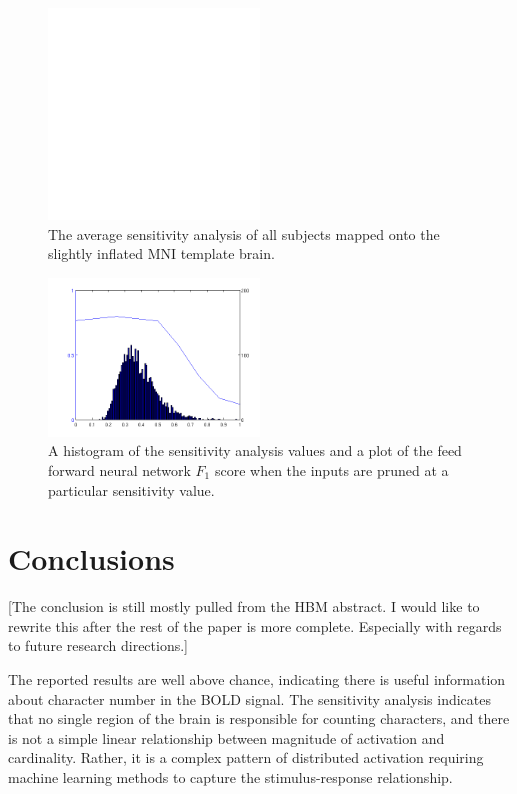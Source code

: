 \documentclass[final]{article}
\begin{document}
\begin{figure}[!htbp]
\centering
\includegraphics[width=0.5\textwidth]{figures/placeholder}
\caption{The average sensitivity analysis of all subjects mapped onto the slightly inflated MNI template brain.}
\label{fig:MNI-average-sensitivity}
\end{figure}

\begin{figure}[!htbp]
\centering
\includegraphics[width=0.5\textwidth]{figures/sensitivity-cutoff}
\caption{A histogram of the sensitivity analysis values and a plot of the feed forward neural network $F_1$ score when the inputs are pruned at a particular sensitivity value. }
\label{fig:sensitivity-cutoff}
\end{figure}

\section{Conclusions}
[The conclusion is still mostly pulled from the HBM abstract. I would like to rewrite this after the rest of the paper is more complete. Especially with regards to future research directions.]

The reported results are well above chance, indicating there is useful information about character number in the BOLD signal.
The sensitivity analysis indicates that no single region of the brain is responsible for counting characters, and there is not a simple linear relationship between magnitude of activation and cardinality.
Rather, it is a complex pattern of distributed activation requiring machine learning methods to capture the stimulus-response relationship.
\end{document}
